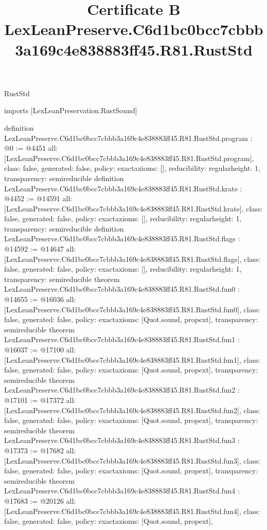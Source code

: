 \begin{lexlean}{RustStd}
\title{Certificate B LexLeanPreserve.C6d1bc0bcc7cbbb3a169c4e838883ff45.R81.RustStd}
\begin{coremodule}
imports [LexLeanPreservation.RustSound]

definition LexLeanPreserve.C6d1bc0bcc7cbbb3a169c4e838883ff45.R81.RustStd.program : @0 := @4451 {
  all: [LexLeanPreserve.C6d1bc0bcc7cbbb3a169c4e838883ff45.R81.RustStd.program],
  class: false,
  generated: false,
  policy: exact{axioms: []},
  reducibility: regular{height: 1},
  transparency: semireducible
}
definition LexLeanPreserve.C6d1bc0bcc7cbbb3a169c4e838883ff45.R81.RustStd.krate : @4452 := @14591 {
  all: [LexLeanPreserve.C6d1bc0bcc7cbbb3a169c4e838883ff45.R81.RustStd.krate],
  class: false,
  generated: false,
  policy: exact{axioms: []},
  reducibility: regular{height: 1},
  transparency: semireducible
}
definition LexLeanPreserve.C6d1bc0bcc7cbbb3a169c4e838883ff45.R81.RustStd.flags : @14592 := @14647 {
  all: [LexLeanPreserve.C6d1bc0bcc7cbbb3a169c4e838883ff45.R81.RustStd.flags],
  class: false,
  generated: false,
  policy: exact{axioms: []},
  reducibility: regular{height: 1},
  transparency: semireducible
}
theorem LexLeanPreserve.C6d1bc0bcc7cbbb3a169c4e838883ff45.R81.RustStd.fun0 : @14655 := @16036 {
  all: [LexLeanPreserve.C6d1bc0bcc7cbbb3a169c4e838883ff45.R81.RustStd.fun0],
  class: false,
  generated: false,
  policy: exact{axioms: [Quot.sound, propext]},
  transparency: semireducible
}
theorem LexLeanPreserve.C6d1bc0bcc7cbbb3a169c4e838883ff45.R81.RustStd.fun1 : @16037 := @17100 {
  all: [LexLeanPreserve.C6d1bc0bcc7cbbb3a169c4e838883ff45.R81.RustStd.fun1],
  class: false,
  generated: false,
  policy: exact{axioms: [Quot.sound, propext]},
  transparency: semireducible
}
theorem LexLeanPreserve.C6d1bc0bcc7cbbb3a169c4e838883ff45.R81.RustStd.fun2 : @17101 := @17372 {
  all: [LexLeanPreserve.C6d1bc0bcc7cbbb3a169c4e838883ff45.R81.RustStd.fun2],
  class: false,
  generated: false,
  policy: exact{axioms: [Quot.sound, propext]},
  transparency: semireducible
}
theorem LexLeanPreserve.C6d1bc0bcc7cbbb3a169c4e838883ff45.R81.RustStd.fun3 : @17373 := @17682 {
  all: [LexLeanPreserve.C6d1bc0bcc7cbbb3a169c4e838883ff45.R81.RustStd.fun3],
  class: false,
  generated: false,
  policy: exact{axioms: [Quot.sound, propext]},
  transparency: semireducible
}
theorem LexLeanPreserve.C6d1bc0bcc7cbbb3a169c4e838883ff45.R81.RustStd.fun4 : @17683 := @20126 {
  all: [LexLeanPreserve.C6d1bc0bcc7cbbb3a169c4e838883ff45.R81.RustStd.fun4],
  class: false,
  generated: false,
  policy: exact{axioms: [Quot.sound, propext]},
}
\end{coremodule}
\end{lexlean}
